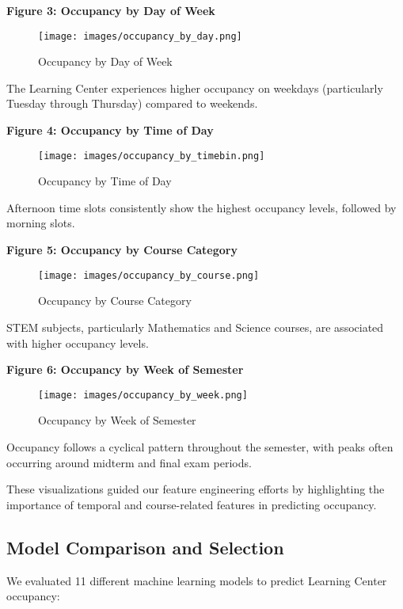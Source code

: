 \documentclass[12pt,letterpaper]{article}
\begin{document}
\textbf{Figure 3: Occupancy by Day of Week}

\begin{figure}[H]
    \centering
    \texttt{[image: images/occupancy\_by\_day.png]}
    \caption{Occupancy by Day of Week}
\end{figure}

The Learning Center experiences higher occupancy on weekdays (particularly Tuesday through Thursday) compared to weekends.

\textbf{Figure 4: Occupancy by Time of Day}

\begin{figure}[H]
    \centering
    \texttt{[image: images/occupancy\_by\_timebin.png]}
    \caption{Occupancy by Time of Day}
\end{figure}

Afternoon time slots consistently show the highest occupancy levels, followed by morning slots.

\textbf{Figure 5: Occupancy by Course Category}

\begin{figure}[H]
    \centering
    \texttt{[image: images/occupancy\_by\_course.png]}
    \caption{Occupancy by Course Category}
\end{figure}

STEM subjects, particularly Mathematics and Science courses, are associated with higher occupancy levels.

\textbf{Figure 6: Occupancy by Week of Semester}

\begin{figure}[H]
    \centering
    \texttt{[image: images/occupancy\_by\_week.png]}
    \caption{Occupancy by Week of Semester}
\end{figure}

Occupancy follows a cyclical pattern throughout the semester, with peaks often occurring around midterm and final exam periods.

These visualizations guided our feature engineering efforts by highlighting the importance of temporal and course-related features in predicting occupancy.

\subsection{Model Comparison and Selection}

We evaluated 11 different machine learning models to predict Learning Center occupancy:
\end{document}
